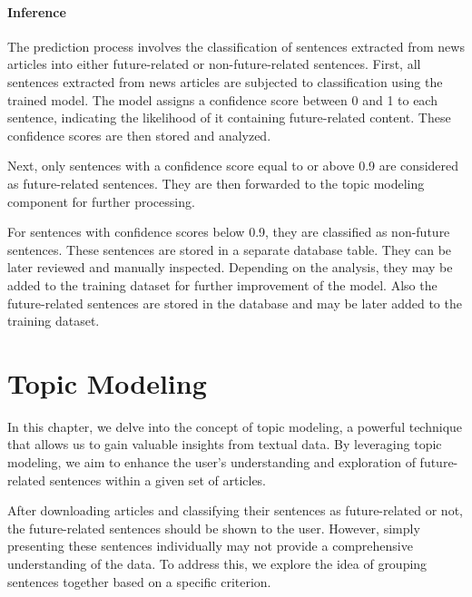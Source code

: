 \documentclass[a4paper,10pt]{report} %
\begin{document}
\subsubsection{Inference}
The prediction process involves the classification of sentences extracted from news articles into either future-related or non-future-related sentences.
First, all sentences extracted from news articles are subjected to classification using the trained model. The model assigns a confidence score between 0 and 1 to each sentence, indicating the likelihood of it containing future-related content. These confidence scores are then stored and analyzed.

Next, only sentences with a confidence score equal to or above 0.9 are considered as future-related sentences. They are then forwarded to the topic modeling component for further processing.

For sentences with confidence scores below 0.9, they are classified as non-future sentences. These sentences are stored in a separate database table. They can be later reviewed and manually inspected. Depending on the analysis, they may be added to the training dataset for further improvement of the model.
Also the future-related sentences are stored in the database and may be later added to the training dataset.


\chapter{Topic Modeling}
In this chapter, we delve into the concept of topic modeling, a powerful technique that allows us to gain valuable insights from textual data. By leveraging topic modeling, we aim to enhance the user's understanding and exploration of future-related sentences within a given set of articles.

After downloading articles and classifying their sentences as future-related or not, the future-related sentences should be shown to the user. However, simply presenting these sentences individually may not provide a comprehensive understanding of the data. To address this, we explore the idea of grouping sentences together based on a specific criterion.
\end{document}
